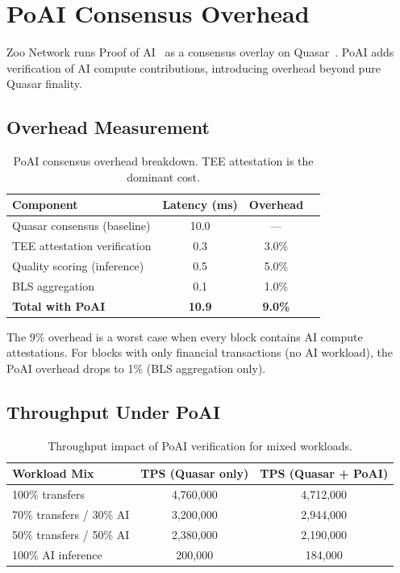 \section{PoAI Consensus Overhead}

\label{sec:poai}

Zoo Network runs Proof of AI~\cite{zoo-poai-consensus} as a consensus overlay on Quasar~\cite{lux-quasar-consensus}. PoAI adds verification of AI compute contributions, introducing overhead beyond pure Quasar finality.

\subsection{Overhead Measurement}

\begin{table}[t]
\centering
\begin{tabular}{lccc}
\toprule
\textbf{Component} & \textbf{Latency (ms)} & \textbf{Overhead} \\
\midrule
Quasar consensus (baseline) & 10.0 & --- \\
TEE attestation verification & 0.3 & 3.0\% \\
Quality scoring (inference) & 0.5 & 5.0\% \\
BLS aggregation & 0.1 & 1.0\% \\
\midrule
\textbf{Total with PoAI} & \textbf{10.9} & \textbf{9.0\%} \\
\bottomrule
\end{tabular}
\caption{PoAI consensus overhead breakdown. TEE attestation is the dominant cost.}
\label{tab:poai}
\end{table}

The 9\% overhead is a worst case when every block contains AI compute attestations. For blocks with only financial transactions (no AI workload), the PoAI overhead drops to 1\% (BLS aggregation only).

\subsection{Throughput Under PoAI}

\begin{table}[t]
\centering
\begin{tabular}{lcc}
\toprule
\textbf{Workload Mix} & \textbf{TPS (Quasar only)} & \textbf{TPS (Quasar + PoAI)} \\
\midrule
100\% transfers & 4,760,000 & 4,712,000 \\
70\% transfers / 30\% AI & 3,200,000 & 2,944,000 \\
50\% transfers / 50\% AI & 2,380,000 & 2,190,000 \\
100\% AI inference & 200,000 & 184,000 \\
\bottomrule
\end{tabular}
\caption{Throughput impact of PoAI verification for mixed workloads.}
\label{tab:poai-throughput}
\end{table}

